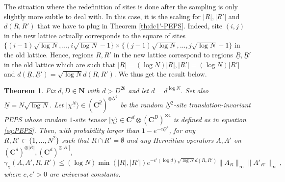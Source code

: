 \documentclass{amsart}
\newtheorem{theorem}{Theorem}[section]
\newcommand{\N}{\mathbf{N}}
\newcommand{\C}{\mathbf{C}}
\renewcommand{\leq}{\leqslant}
\newcommand{\ket}[1]{| #1 \rangle}
\begin{document}
The situation where the redefinition of sites is done after the sampling is only slightly more subtle to deal with. In this case, it is the scaling for $|R|,|R'|$ and $d(R,R')$ that we have to plug in Theorem \ref{th:dc1'-PEPS}. Indeed, site $(i,j)$ in the new lattice actually corresponds to the square of sites $\{(i-1)\sqrt{\log N},\ldots,i\sqrt{\log N}-1\} \times \{(j-1)\sqrt{\log N},\ldots,j\sqrt{\log N}-1\}$ in the old lattice. Hence, regions $R,R'$ in the new lattice correspond to regions $\underline{R},\underline{R}'$ in the old lattice which are such that $|\underline{R}|=(\log N)|R|,|\underline{R}'|=(\log N)|R'|$ and $d(\underline{R},\underline{R}')=\sqrt{\log N}d(R,R')$. We thus get the result below.

\begin{theorem} \label{th:dc1'-PEPS-block2}
    Fix $\underline{d},\underline{D}\in\N$ with $\underline{d}>\underline{D}^{26}$ and let $d=\underline{d}^{\log N}$. Set also $\underline{N}= N\sqrt{\log N}$. Let $\ket{\chi^{\underline{N}}}\in(\C^{\hat{d}})^{\otimes \underline{N}^2}$ be the random $\underline{N}^2$-site translation-invariant PEPS whose random $1$-site tensor $\ket{\chi}\in\C^{\underline{d}}\otimes(\C^{\underline{D}})^{\otimes 4}$ is defined as in equation \eqref{eq:PEPS}. Then, with probability larger than $1-e^{-c\underline{D}^4}$, for any $R,R'\subset\{1,\ldots,N^2\}$ such that $R\cap R'=\emptyset$ and any Hermitian operators $A,A'$ on $(\C^d)^{\otimes |R|},(\C^d)^{\otimes |R'|}$,
    \[ \gamma_{\chi}(A,A',R,R') \leq (\log N)\min(|R|,|R'|)e^{-c'(\log\underline{d})\sqrt{\log N}d(R,R')} \|A_R\|_{\infty}\|A'_{R'}\|_{\infty} \, , \]
    where $c,c'>0$ are universal constants.
\end{theorem}
\end{document}
